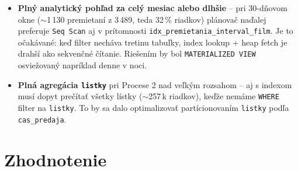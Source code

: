 \documentclass[11pt, a4paper]{article}
\begin{document}
\begin{itemize}
    \item \textbf{Plný analytický pohľad za celý mesiac alebo dlhšie}
    -- pri 30-dňovom okne ($\sim$1\,130 premietaní z 3\,489, teda
    32\,\% riadkov) plánovač naďalej preferuje \texttt{Seq Scan} aj
    v prítomnosti \texttt{idx\_premietania\_interval\_film}.
    Je to očakávané: keď filter necháva tretinu tabuľky, index lookup
    + heap fetch je drahší ako sekvenčné čítanie.
    Riešením by bol \texttt{MATERIALIZED VIEW} osviežovaný napríklad
    denne v noci.

    \item \textbf{Plná agregácia \texttt{listky}} pri Procese 2 nad
    veľkým rozsahom -- aj s indexom musí dopyt prečítať všetky lístky
    ($\sim$257\,k riadkov), keďže nemáme \texttt{WHERE} filter na
    \texttt{listky}. To by sa dalo optimalizovať partícionovaním
    \texttt{listky} podľa \texttt{cas\_predaja}.
\end{itemize}

\newpage
\section{Zhodnotenie}
\label{sec:zhodnotenie}
\end{document}
